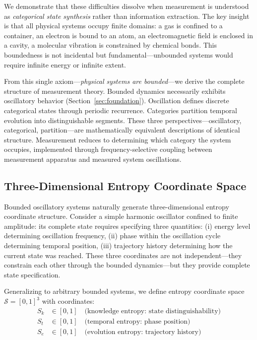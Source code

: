 \documentclass[11pt,a4paper]{article}
\theoremstyle{remark}
\newcommand{\Sk}{S_k}
\newcommand{\St}{S_t}
\newcommand{\Se}{S_e}
\newcommand{\Sspace}{\mathcal{S}}
\begin{document}
We demonstrate that these difficulties dissolve when measurement is understood as \textit{categorical state synthesis} rather than information extraction. The key insight is that all physical systems occupy finite domains: a gas is confined to a container, an electron is bound to an atom, an electromagnetic field is enclosed in a cavity, a molecular vibration is constrained by chemical bonds. This boundedness is not incidental but fundamental—unbounded systems would require infinite energy or infinite extent.

From this single axiom—\textit{physical systems are bounded}—we derive the complete structure of measurement theory. Bounded dynamics necessarily exhibits oscillatory behavior (Section~\ref{sec:foundation}). Oscillation defines discrete categorical states through periodic recurrence. Categories partition temporal evolution into distinguishable segments. These three perspectives—oscillatory, categorical, partition—are mathematically equivalent descriptions of identical structure. Measurement reduces to determining which category the system occupies, implemented through frequency-selective coupling between measurement apparatus and measured system oscillations.

\subsection{Three-Dimensional Entropy Coordinate Space}

Bounded oscillatory systems naturally generate three-dimensional entropy coordinate structure. Consider a simple harmonic oscillator confined to finite amplitude: its complete state requires specifying three quantities: (i) energy level determining oscillation frequency, (ii) phase within the oscillation cycle determining temporal position, (iii) trajectory history determining how the current state was reached. These three coordinates are not independent—they constrain each other through the bounded dynamics—but they provide complete state specification.

Generalizing to arbitrary bounded systems, we define entropy coordinate space $\Sspace = [0,1]^3$ with coordinates:
\begin{align}
\Sk &\in [0,1] \quad \text{(knowledge entropy: state distinguishability)} \\
\St &\in [0,1] \quad \text{(temporal entropy: phase position)} \\
\Se &\in [0,1] \quad \text{(evolution entropy: trajectory history)}
\end{align}
\end{document}
